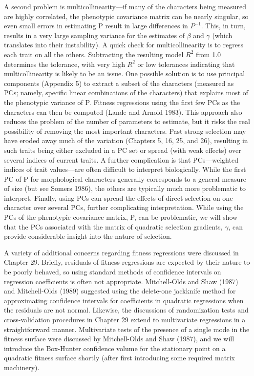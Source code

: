 \documentclass{article}
\begin{document}
A second problem is multicollinearity—if many of the characters being measured are highly correlated, the phenotypic covariance matrix can be nearly singular, so even small errors in estimating P result in large differences in  $ P^{-1} $. This, in turn, results in a very large sampling variance for the estimates of  $ \beta $ and  $ \gamma $ (which translates into their instability). A quick check for multicollinearity is to regress each trait on all the others. Subtracting the resulting model  $ R^{2} $ from 1.0 determines the tolerance, with very high  $ R^{2} $ or low tolerances indicating that multicollinearity is likely to be an issue. One possible solution is to use principal components (Appendix 5) to extract a subset of the characters (measured as PCs; namely, specific linear combinations of the characters) that explains most of the phenotypic variance of P. Fitness regressions using the first few PCs as the characters can then be computed (Lande and Arnold 1983). This approach also reduces the problem of the number of parameters to estimate, but it risks the real possibility of removing the most important characters. Past strong selection may have eroded away much of the variation (Chapters 5, 16, 25, and 26), resulting in such traits being either excluded in a PC set or spread (with weak effects) over several indices of current traits. A further complication is that PCs—weighted indices of trait values—are often difficult to interpret biologically. While the first PC of P for morphological characters generally corresponds to a general measure of size (but see Somers 1986), the others are typically much more problematic to interpret. Finally, using PCs can spread the effects of direct selection on one character over several PCs, further complicating interpretation. While using the PCs of the phenotypic covariance matrix, P, can be problematic, we will show that the PCs associated with the matrix of quadratic selection gradients,  $ \gamma $, can provide considerable insight into the nature of selection.

A variety of additional concerns regarding fitness regressions were discussed in Chapter 29. Briefly, residuals of fitness regressions are expected by their nature to be poorly behaved, so using standard methods of confidence intervals on regression coefficients is often not appropriate. Mitchell-Olds and Shaw (1987) and Mitchell-Olds (1989) suggested using the delete-one jackknife method for approximating confidence intervals for coefficients in quadratic regressions when the residuals are not normal. Likewise, the discussions of randomization tests and cross-validation procedures in Chapter 29 extend to multivariate regressions in a straightforward manner. Multivariate tests of the presence of a single mode in the fitness surface were discussed by Mitchell-Olds and Shaw (1987), and we will introduce the Box-Hunter confidence volume for the stationary point on a quadratic fitness surface shortly (after first introducing some required matrix machinery).
\end{document}
